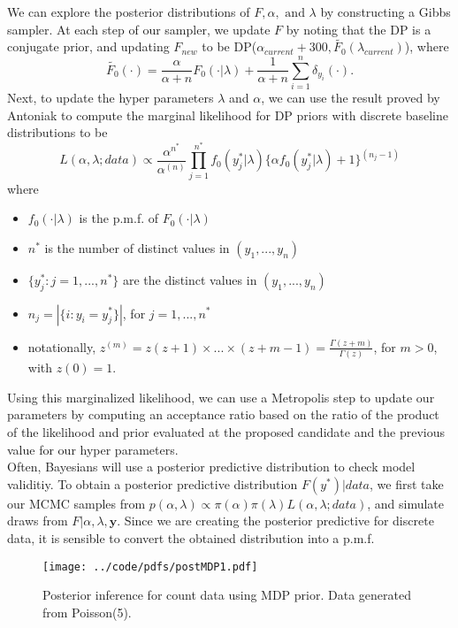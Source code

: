 \documentclass{article}
\def\beginmyfig{\begin{figure}[htbp]\begin{center}}
\def\endmyfig{\end{center}\end{figure}}
\def\prodl{\prod\limits_{j=1}^{n^*}}
\def\suml{\sum\limits_{i=1}^n}
\def\ds{\displaystyle}
\begin{document}
\noindent
We can explore the posterior distributions of $F, \alpha, \text{ and } \lambda$
by constructing a Gibbs sampler. At each step of our sampler, we update
$F$ by noting that the DP is a conjugate prior, and updating $F_{new}$ to be
DP($\alpha_{current} + 300, \widetilde{F_0}(\lambda_{current}) $), where 
\[
\widetilde{F_0}(\cdot) = 
\ds\frac{\alpha}{\alpha+n}F_0(\cdot|\lambda) + \frac{1}{\alpha+n} \suml\delta_{y_i}(\cdot).
\]
Next, to update the hyper parameters $\lambda$ and $\alpha$, we can use the
result proved by Antoniak to compute the marginal likelihood for DP priors with
discrete baseline distributions to be
\[
  L(\alpha, \lambda ; data) \propto 
  \ds\frac{\alpha^{n^*}}{\alpha^{(n)}} \prodl f_0(y_j^*|\lambda)
  \{\alpha f_0(y_j^*|\lambda) + 1\} ^{(n_j-1)}
\]
where 
\begin{itemize}
  \item $f_0(\cdot |\lambda)$ is the p.m.f. of $F_0(\cdot |\lambda)$
  \item $n^*$ is the number of distinct values in $(y_1,...,y_n)$
  \item $\{y_j^*: j = 1, ..., n^*\}$ are the distinct values in $(y_1,...,y_n)$
  \item $n_j = |\{i: y_i = y_j^*  \}|$, for $j = 1,..., n^*$
  \item notationally, $z^{(m)} = z(z + 1) \times ... \times (z + m - 1) = 
    \ds\frac{\Gamma(z+m)}{\Gamma(z)}$, for $m > 0$, with $z(0) = 1$.
\end{itemize}
Using this marginalized likelihood, we can use a Metropolis step to update our
parameters by computing an acceptance ratio based on the ratio of the product
of the likelihood and prior evaluated at the proposed candidate and the
previous value for our hyper parameters. \\

\noindent
Often, Bayesians will use a posterior predictive distribution to check model
validitiy. To obtain a posterior predictive distribution $F(y^*)|data$, we
first take our MCMC samples from $p(\alpha,\lambda) \propto
\pi(\alpha)\pi(\lambda) L(\alpha,\lambda; data)$, and simulate draws from
$F|\alpha,\lambda,\mathbf y$.  Since we are creating the posterior predictive
for discrete data, it is sensible to convert the obtained distribution into 
a p.m.f. \\

\beginmyfig
  \texttt{[image: ../code/pdfs/postMDP1.pdf]}
  \caption{Posterior inference for count data using MDP prior. Data generated from
  Poisson(5).}
\endmyfig
\end{document}
